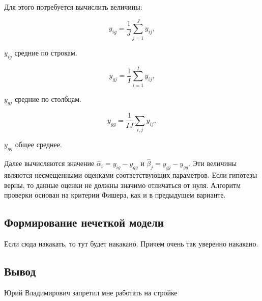 Для этого потребуется вычислить величины:

\begin{equation}
\label{eq:yignew}
y_{ig}=\frac{1}{J}\sum_{j=1}^{J}{y_{ij}},
\end{equation}
\begin{eqexpl}[15mm]
\item{$y_{ig}$} средние по строкам.
\end{eqexpl}

\begin{equation}
\label{eq:ygjnew}
y_{gj}=\frac{1}{I}\sum_{i=1}^{I}{y_{ij}},
\end{equation}
\begin{eqexpl}[15mm]
\item{$y_{gj}$} средние по столбцам.
\end{eqexpl}

\begin{equation}
\label{eq:yggnew}
y_{gg}=\frac{1}{IJ}\sum_{i,j}{y_{ij}},
\end{equation}
\begin{eqexpl}[15mm]
\item{$y_{gg}$} общее среднее.
\end{eqexpl}

Далее вычисляются значение $\widehat{\alpha}_i = y_{ig}-y_{gg}$ и $\widehat{\beta}_j=y_{gj}-y_{gg}$. Эти величины являются несмещенными оценками соответствующих параметров. Если гипотезы верны, то данные оценки не должны значимо отличаться от нуля. Алгоритм проверки основан на критерии Фишера, как и в предыдущем варианте. \cite{disperMethod}

\subsection{Формирование нечеткой модели}
Если сюда накакать, то тут будет накакано. Причем очень так уверенно накакано.

\subsection*{Вывод}
Юрий Владимирович запретил мне работать на стройке

\pagebreak